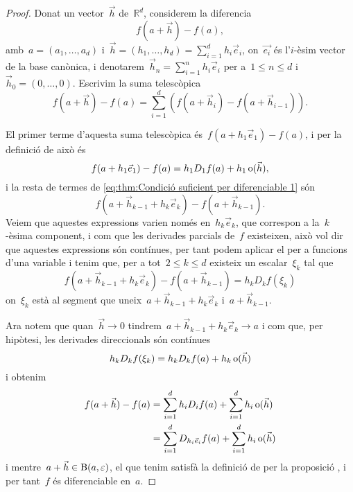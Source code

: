 \documentclass[../../main.tex]{subfiles}
\begin{document}
    \begin{proof}
        Donat un vector~\(\vec{h}\) de~\(\mathbb{R}^{d}\), considerem la diferencia
        \[
            f(a+\vec{h})-f(a),
        \]
        amb~\(a=(a_{1},\dots,a_{d})\) i~\(\vec{h}=(h_{1},\dots,h_{d})=\sum_{i=1}^{d}h_{i}\vec{e}_{i}\), on~\(\vec{e_{i}}\) és l'\(i\)-èsim vector de la base canònica, i denotarem~\(\vec{h}_{n}=\sum_{i=1}^{n}h_{i}\vec{e}_{i}\) per a~\(1\leq n\leq d\) i~\(\vec{h}_{0}=(0,\dots,0)\).
        Escrivim la suma telescòpica
        \begin{equation}\label{eq:thm:Condició suficient per diferenciable 1}
        f(a+\vec{h})-f(a)=\sum_{i=1}^{d}\left(f(a+\vec{h}_{i})-f(a+\vec{h}_{i-1})\right).
        \end{equation}

        El primer terme d'aquesta suma telescòpica és~\(f(a+h_{1}\vec{e}_{1})-f(a)\), i per la definició de  això és
        \[
            f(a+h_{1}\vec{e}_{1})-f(a)=h_{1}D_{1}f(a)+h_{1}\operatorname{o}(\vec{h}),
        \]
        i la resta de termes de \eqref{eq:thm:Condició suficient per diferenciable 1} són
        \[
            f(a+\vec{h}_{k-1}+h_{k}\vec{e}_{k})-f(a+\vec{h}_{k-1}).
        \]
        Veiem que aquestes expressions varien només en~\(h_{k}\vec{e}_{k}\), que correspon a la~\(k\)-èsima component, i com que les derivades parcials de~\(f\) existeixen, això vol dir que aquestes expressions són contínues, per tant podem aplicar el  per a funcions d'una variable i tenim que, per a tot~\(2\leq k\leq d\) existeix un escalar~\(\xi_{k}\) tal que
        \[
            f(a+\vec{h}_{k-1}+h_{k}\vec{e}_{k})-f(a+\vec{h}_{k-1})=h_{k}D_{k}f(\xi_{k})
        \]
        on~\(\xi_{k}\) està al segment que uneix~\(a+\vec{h}_{k-1}+h_{k}\vec{e}_{k}\) i~\(a+\vec{h}_{k-1}\).

        Ara notem que quan~\(\vec{h}\to0\) tindrem~\(a+\vec{h}_{k-1}+h_{k}\vec{e}_{k}\to a\) i com que, per hipòtesi, les derivades direccionals són contínues
        \[
            h_{k}D_{k}f(\xi_{k})=h_{k}D_{k}f(a)+h_{k}\operatorname{o}(\vec{h})
        \]
        i obtenim
        \begin{align*}
        f(a+\vec{h})-f(a)&=\sum_{i=1}^{d}h_{i}D_{i}f(a)+\sum_{i=1}^{d}h_{i}\operatorname{o}(\vec{h})\\
        &=\sum_{i=1}^{d}D_{h_{i}\vec{e}_{i}}f(a)+\sum_{i=1}^{d}h_{i}\operatorname{o}(\vec{h})
        \end{align*}
        i mentre~\(a+\vec{h}\in\operatorname{B}(a,\varepsilon)\), el que tenim satisfà la definició de  per la proposició , i per tant~\(f\) és diferenciable en~\(a\).
    \end{proof}
\end{document}

